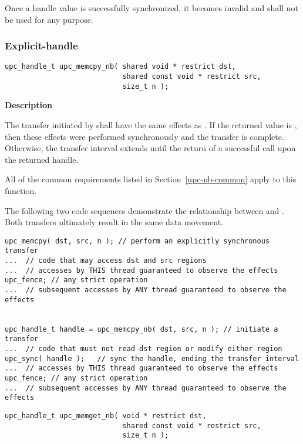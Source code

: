 \np Once a handle value is successfully synchronized, it becomes invalid and shall not be
used for any purpose.

\newpage
\subsubsection{Explicit-handle \TIFs}
\def\bfunc{upc\_memcpy\_nb}
\def\sfunc{\memcpy}
\funcheader

\begin{verbatim}
upc_handle_t upc_memcpy_nb( shared void * restrict dst,
                            shared const void * restrict src, 
                            size_t n );
\end{verbatim}

{\bf Description}

\np The transfer initiated by \func\args shall have the same effects as \sfunc\args.
If the returned value is \complete, then these effects were performed synchronously
and the transfer is complete. Otherwise, the transfer interval extends until
the return of a successful \sync call upon the returned handle.

\np All of the common requirements listed in Section~\ref{upc-nb-common} apply to this function.

\np The following two code sequences demonstrate the relationship between
\sfunc and \func. Both transfers ultimately result in the same data movement.

\begin{verbatim}
upc_memcpy( dst, src, n ); // perform an explicitly synchronous transfer
...  // code that may access dst and src regions
...  // accesses by THIS thread guaranteed to observe the effects
upc_fence; // any strict operation
...  // subsequent accesses by ANY thread guaranteed to observe the effects


upc_handle_t handle = upc_memcpy_nb( dst, src, n ); // initiate a transfer 
...  // code that must not read dst region or modify either region
upc_sync( handle );   // sync the handle, ending the transfer interval
...  // accesses by THIS thread guaranteed to observe the effects
upc_fence; // any strict operation
...  // subsequent accesses by ANY thread guaranteed to observe the effects
\end{verbatim}
\vfill

\def\bfunc{upc\_memget\_nb}
\def\sfunc{\memget}
\funcheader

\begin{verbatim}
upc_handle_t upc_memget_nb( void * restrict dst,
                            shared const void * restrict src, 
                            size_t n );
\end{verbatim}

